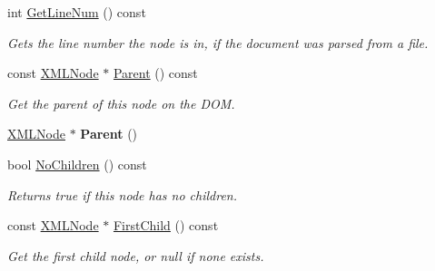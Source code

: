 \begin{DoxyCompactItemize}
\item 
\mbox{\label{classCPlantBox_1_1tinyxml2_1_1XMLNode_adfc131539c71f11f3f7b52679b4a3ef2}} 
int \hyperlink{classCPlantBox_1_1tinyxml2_1_1XMLNode_adfc131539c71f11f3f7b52679b4a3ef2}{Get\+Line\+Num} () const
\begin{DoxyCompactList}\small\item\em Gets the line number the node is in, if the document was parsed from a file. \end{DoxyCompactList}\item 
\mbox{\label{classCPlantBox_1_1tinyxml2_1_1XMLNode_ab896c627b416371cf7221ce357377dd1}} 
const \hyperlink{classCPlantBox_1_1tinyxml2_1_1XMLNode}{X\+M\+L\+Node} $\ast$ \hyperlink{classCPlantBox_1_1tinyxml2_1_1XMLNode_ab896c627b416371cf7221ce357377dd1}{Parent} () const
\begin{DoxyCompactList}\small\item\em Get the parent of this node on the D\+OM. \end{DoxyCompactList}\item 
\mbox{\label{classCPlantBox_1_1tinyxml2_1_1XMLNode_ae87c34de21682ee06c12dcd2650cf342}} 
\hyperlink{classCPlantBox_1_1tinyxml2_1_1XMLNode}{X\+M\+L\+Node} $\ast$ {\bfseries Parent} ()
\item 
\mbox{\label{classCPlantBox_1_1tinyxml2_1_1XMLNode_a65377301d736ae1a54ccb2f54dd6d0b7}} 
bool \hyperlink{classCPlantBox_1_1tinyxml2_1_1XMLNode_a65377301d736ae1a54ccb2f54dd6d0b7}{No\+Children} () const
\begin{DoxyCompactList}\small\item\em Returns true if this node has no children. \end{DoxyCompactList}\item 
\mbox{\label{classCPlantBox_1_1tinyxml2_1_1XMLNode_a46873dd9f3eea6d7fcfc5b6ae8919afb}} 
const \hyperlink{classCPlantBox_1_1tinyxml2_1_1XMLNode}{X\+M\+L\+Node} $\ast$ \hyperlink{classCPlantBox_1_1tinyxml2_1_1XMLNode_a46873dd9f3eea6d7fcfc5b6ae8919afb}{First\+Child} () const
\begin{DoxyCompactList}\small\item\em Get the first child node, or null if none exists. \end{DoxyCompactList}\item 

\end{DoxyCompactItemize}
